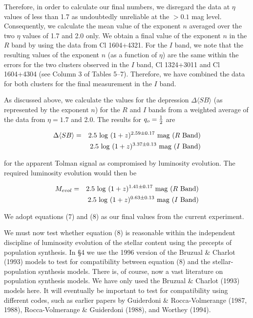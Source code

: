 \documentclass[preprint]{aastex}
\begin{document}
Therefore, in order to calculate our final numbers, we disregard the
data at $\eta$ values of less than 1.7 as undoubtedly unreliable at
the $> 0.1$ mag level. Consequently, we calculate the mean value of
the exponent $n$ averaged over the two $\eta$ values of 1.7 and 2.0
only.  We obtain a final value of the exponent $n$ in the $R$ band by
using the data from Cl 1604+4321. For the $I$ band, we note that the
resulting values of the exponent $n$ (as a function of $\eta$) are the
same within the errors for the two clusters observed in the $I$ band,
Cl 1324+3011 and Cl 1604+4304 (see Column 3 of Tables 5--7).
Therefore, we have combined the data for both clusters for the final
measurement in the $I$ band.

As discussed above, we calculate the values for the depression $\Delta
\langle SB \rangle$ (as represented by the exponent $n$) for the $R$
and $I$ bands from a weighted average of the data from $\eta = 1.7$
and 2.0. The results for $q_o = {1\over{2}}$ are

\begin{eqnarray}
\Delta \langle SB \rangle & = & 2.5~{\rm log}~(1 + z)^{2.59 \pm
0.17}~{\rm mag}~(R~{\rm Band}) \nonumber \\ 
& & \mbox{} 2.5~{\rm log}~(1 + z)^{3.37 \pm
0.13}~{\rm mag}~(I~{\rm Band}) 
\end{eqnarray}
	
\noindent for the apparent Tolman signal as compromised by luminosity
evolution. The required luminosity evolution would then be

\begin{eqnarray}
M_{evol} & = & 2.5~{\rm log}~(1 + z)^{1.41 \pm
0.17}~{\rm mag}~(R~{\rm Band}) \nonumber \\ 
& & \mbox{} 2.5~{\rm log}~(1 + z)^{0.63 \pm
0.13}~{\rm mag}~(I~{\rm Band}) 
\end{eqnarray}

\noindent We adopt equations (7) and (8) as our final values 
from the current experiment.
     
We must now test whether equation (8) is reasonable within the
independent discipline of luminosity evolution of the stellar content
using the precepts of population synthesis. In \S 4 we use the 1996
version of the Bruzual \& Charlot (1993) models to test for
compatibility between equation (8) and the stellar-population
synthesis models.  There is, of course, now a vast literature on
population synthesis models. We have only used the Bruzual \& Charlot
(1993) models here. It will eventually be important to test for
compatibility using different codes, such as earlier papers by
Guiderdoni \& Rocca-Volmerange (1987, 1988), Rocca-Volmerange \&
Guiderdoni (1988), and Worthey (1994). 
\end{document}
